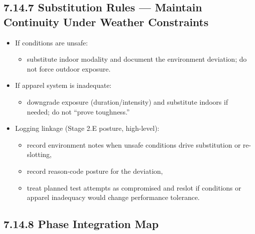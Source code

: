 \documentclass[10pt]{article}
\begin{document}
\subsection*{7.14.7 Substitution Rules — Maintain Continuity Under Weather Constraints}
{}

\begin{itemize}
\item If conditions are unsafe:
  \begin{itemize}
  \item substitute indoor modality and document the environment deviation; do not force outdoor exposure.
  \end{itemize}
\item If apparel system is inadequate:
  \begin{itemize}
  \item downgrade exposure (duration/intensity) and substitute indoors if needed; do not “prove toughness.”
  \end{itemize}
\item Logging linkage (Stage 2.E posture, high-level):
  \begin{itemize}
  \item record environment notes when unsafe conditions drive substitution or re-slotting,
  \item record reason-code posture for the deviation,
  \item treat planned test attempts as compromised and reslot if conditions or apparel inadequacy would change performance tolerance.
  \end{itemize}
\end{itemize}

\subsection*{7.14.8 Phase Integration Map}
{}

\begingroup
\scriptsize
\setlength{\tabcolsep}{2pt}
\renewcommand{\arraystretch}{1.12}
\end{document}
